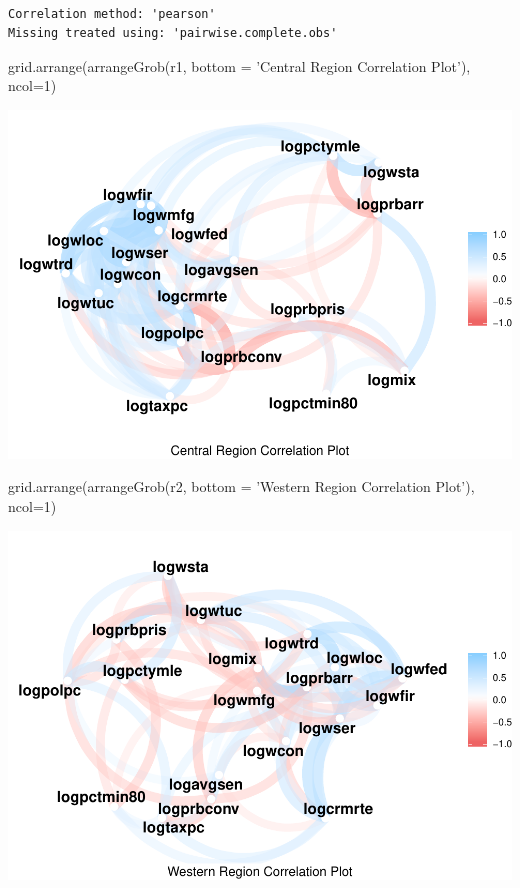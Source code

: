 \documentclass[]{article}
\newenvironment{Shaded}{}{}
\newcommand{\DataTypeTok}[1]{#1}
\newcommand{\DecValTok}[1]{#1}
\newcommand{\KeywordTok}[1]{\textcolor[rgb]{0.00,0.00,1.00}{#1}}
\newcommand{\NormalTok}[1]{#1}
\newcommand{\StringTok}[1]{\textcolor[rgb]{0.00,0.50,0.50}{#1}}
\begin{document}
\begin{verbatim}

Correlation method: 'pearson'
Missing treated using: 'pairwise.complete.obs'
\end{verbatim}

\begin{Shaded}
\begin{Highlighting}[]
\KeywordTok{grid.arrange}\NormalTok{(}\KeywordTok{arrangeGrob}\NormalTok{(r1, }\DataTypeTok{bottom =} \StringTok{'Central Region Correlation Plot'}\NormalTok{), }\DataTypeTok{ncol=}\DecValTok{1}\NormalTok{)}
\end{Highlighting}
\end{Shaded}

\includegraphics{Bagnard_Gaustad_Hartman_Leung_Lab_3_files/figure-latex/unnamed-chunk-107-1.pdf}

\begin{Shaded}
\begin{Highlighting}[]
\KeywordTok{grid.arrange}\NormalTok{(}\KeywordTok{arrangeGrob}\NormalTok{(r2, }\DataTypeTok{bottom =} \StringTok{'Western Region Correlation Plot'}\NormalTok{), }\DataTypeTok{ncol=}\DecValTok{1}\NormalTok{)}
\end{Highlighting}
\end{Shaded}

\includegraphics{Bagnard_Gaustad_Hartman_Leung_Lab_3_files/figure-latex/unnamed-chunk-107-2.pdf}
\end{document}
